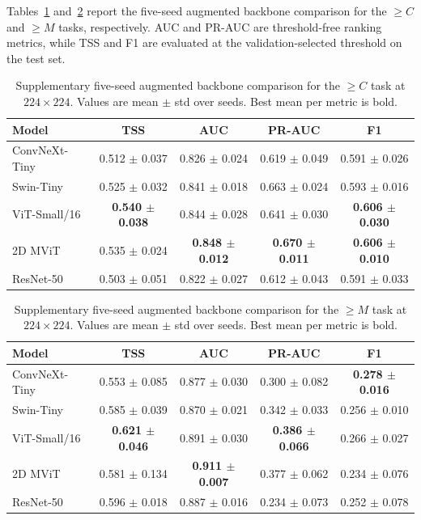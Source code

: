 Tables~\ref{tab:appendix_backbone_cplus} and~\ref{tab:appendix_backbone_mplus} report the five-seed augmented backbone comparison for the $\geq C$ and $\geq M$ tasks, respectively. AUC and PR-AUC are threshold-free ranking metrics, while TSS and F1 are evaluated at the validation-selected threshold on the test set.

\begin{table}[!htbp]
\centering
\footnotesize
\setlength{\tabcolsep}{5pt}
\caption{Supplementary five-seed augmented backbone comparison for the $\geq C$ task at $224\times224$. Values are mean $\pm$ std over seeds. Best mean per metric is bold.}
\label{tab:appendix_backbone_cplus}
\begin{tabular}{lcccc}
\toprule
Model & TSS & AUC & PR-AUC & F1 \\
\midrule
ConvNeXt-Tiny & 0.512 $\pm$ 0.037 & 0.826 $\pm$ 0.024 & 0.619 $\pm$ 0.049 & 0.591 $\pm$ 0.026 \\
Swin-Tiny & 0.525 $\pm$ 0.032 & 0.841 $\pm$ 0.018 & 0.663 $\pm$ 0.024 & 0.593 $\pm$ 0.016 \\
ViT-Small/16 & \textbf{0.540 $\pm$ 0.038} & 0.844 $\pm$ 0.028 & 0.641 $\pm$ 0.030 & \textbf{0.606 $\pm$ 0.030} \\
2D MViT & 0.535 $\pm$ 0.024 & \textbf{0.848 $\pm$ 0.012} & \textbf{0.670 $\pm$ 0.011} & \textbf{0.606 $\pm$ 0.010} \\
ResNet-50 & 0.503 $\pm$ 0.051 & 0.822 $\pm$ 0.027 & 0.612 $\pm$ 0.043 & 0.591 $\pm$ 0.033 \\
\bottomrule
\end{tabular}
\end{table}

\begin{table}[!htbp]
\centering
\footnotesize
\setlength{\tabcolsep}{5pt}
\caption{Supplementary five-seed augmented backbone comparison for the $\geq M$ task at $224\times224$. Values are mean $\pm$ std over seeds. Best mean per metric is bold.}
\label{tab:appendix_backbone_mplus}
\begin{tabular}{lcccc}
\toprule
Model & TSS & AUC & PR-AUC & F1 \\
\midrule
ConvNeXt-Tiny & 0.553 $\pm$ 0.085 & 0.877 $\pm$ 0.030 & 0.300 $\pm$ 0.082 & \textbf{0.278 $\pm$ 0.016} \\
Swin-Tiny & 0.585 $\pm$ 0.039 & 0.870 $\pm$ 0.021 & 0.342 $\pm$ 0.033 & 0.256 $\pm$ 0.010 \\
ViT-Small/16 & \textbf{0.621 $\pm$ 0.046} & 0.891 $\pm$ 0.030 & \textbf{0.386 $\pm$ 0.066} & 0.266 $\pm$ 0.027 \\
2D MViT & 0.581 $\pm$ 0.134 & \textbf{0.911 $\pm$ 0.007} & 0.377 $\pm$ 0.062 & 0.234 $\pm$ 0.076 \\
ResNet-50 & 0.596 $\pm$ 0.018 & 0.887 $\pm$ 0.016 & 0.234 $\pm$ 0.073 & 0.252 $\pm$ 0.078 \\
\bottomrule
\end{tabular}
\end{table}

